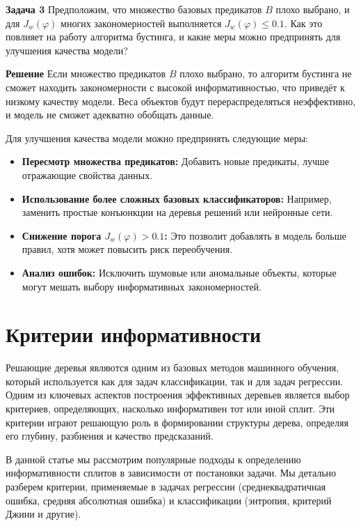 \vspace{0.5cm}

\textbf{Задача 3}  
Предположим, что множество базовых предикатов \( B \) плохо выбрано, и для \( J_w(\varphi) \) многих закономерностей выполняется \( J_w(\varphi) \leq 0.1 \). Как это повлияет на работу алгоритма бустинга, и какие меры можно предпринять для улучшения качества модели?  

\textbf{Решение}  
Если множество предикатов \( B \) плохо выбрано, то алгоритм бустинга не сможет находить закономерности с высокой информативностью, что приведёт к низкому качеству модели. Веса объектов будут перераспределяться неэффективно, и модель не сможет адекватно обобщать данные.  

Для улучшения качества модели можно предпринять следующие меры:
\begin{itemize}
    \item \textbf{Пересмотр множества предикатов:} Добавить новые предикаты, лучше отражающие свойства данных.  
    \item \textbf{Использование более сложных базовых классификаторов:} Например, заменить простые конъюнкции на деревья решений или нейронные сети.  
    \item \textbf{Снижение порога \( J_w(\varphi) > 0.1 \):} Это позволит добавлять в модель больше правил, хотя может повысить риск переобучения.  
    \item \textbf{Анализ ошибок:} Исключить шумовые или аномальные объекты, которые могут мешать выбору информативных закономерностей.
\end{itemize}


\section*{Критерии информативности}

Решающие деревья являются одним из базовых методов машинного обучения, который используется как для задач классификации, так и для задач регрессии. Одним из ключевых аспектов построения эффективных деревьев является выбор критериев, определяющих, насколько информативен тот или иной сплит. Эти критерии играют решающую роль в формировании структуры дерева, определяя его глубину, разбиения и качество предсказаний. 

В данной статье мы рассмотрим популярные подходы к определению информативности сплитов в зависимости от постановки задачи. Мы детально разберем критерии, применяемые в задачах регрессии (среднеквадратичная ошибка, средняя абсолютная ошибка) и классификации (энтропия, критерий Джини и другие).


